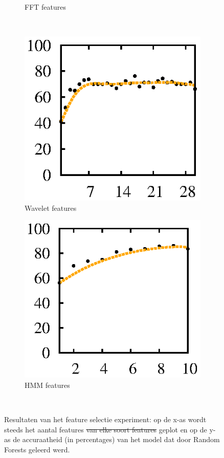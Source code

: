 \documentclass{article}
\providecommand{\DIFdel}[1]{{\protect\color{red}\sout{#1}}}                      %
\providecommand{\DIFdelFL}[1]{\DIFdel{#1}} %
\providecommand{\DIFdelbeginFL}{} %
\providecommand{\DIFdelendFL}{} %
\begin{document}
\begin{figure}[htb]
\begin{subfigure}[b]{.49\linewidth}
    \caption{FFT features}\label{fig:1b}
  \end{subfigure} \\
  \begin{subfigure}[b]{.49\linewidth}
    \centering
    \includegraphics[width=.99\textwidth]{figures/DWTFeatures}
    \caption{Wavelet features}\label{fig:1c}
  \end{subfigure}
  \begin{subfigure}[b]{.49\linewidth}
    \centering
    \includegraphics[width=.99\textwidth]{figures/HMMFeatures}
    \caption{HMM features}\label{fig:1e}
  \end{subfigure} \\


  \caption{Resultaten van het feature selectie experiment: op de x-as wordt steeds het aantal features \DIFdelbeginFL \DIFdelFL{van elke soort features }\DIFdelendFL geplot en op de y-as de accuraatheid (in percentages) van het model dat door Random Forests geleerd werd.}\label{fig:1}
\end{figure}
\end{document}
